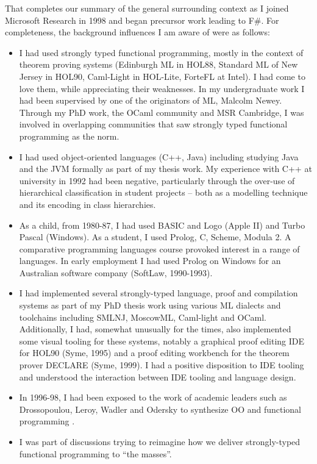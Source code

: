 \documentclass[acmsmall]{acmart}\settopmatter{}
\begin{document}
That completes our summary of the general surrounding context as I joined Microsoft Research in 1998 and began precursor work leading to F\#. For completeness,
the background influences I am aware of were as follows:

\begin{itemize}
\item I had used strongly typed functional programming, mostly in the context of theorem proving systems (Edinburgh ML in HOL88, Standard ML
of New Jersey in HOL90, Caml-Light in HOL-Lite, ForteFL at Intel). I had come to love them, while appreciating their weaknesses. In my undergraduate work
I had been supervised by one of the originators of ML, Malcolm Newey. Through my PhD work, the OCaml community and MSR Cambridge, I was
involved in overlapping communities that saw strongly typed functional programming as the norm.
\item I had used object-oriented languages (C++, Java) including studying Java and the JVM formally as part of my thesis work.  My
experience with C++ at university in 1992 had been negative, particularly through the over-use of hierarchical classification in student
projects – both as a modelling technique and its encoding in class hierarchies.  
\item As a child, from 1980-87, I had used BASIC and Logo (Apple II) and Turbo Pascal (Windows). As a student, I used Prolog, C, Scheme, Modula 2. A
comparative programming languages course provoked interest in a range of languages. In early employment I had used Prolog on Windows for an Australian
software company (SoftLaw, 1990-1993). 
\item I had implemented several strongly-typed language, proof and compilation systems as part of my PhD thesis work using various ML dialects and
toolchains including SMLNJ, MoscowML, Caml-light and OCaml. Additionally, I had, somewhat unusually for the times, also implemented some visual tooling
for these systems, notably a graphical proof editing IDE for HOL90 (Syme, 1995) and a proof editing workbench for the theorem prover DECLARE (Syme, 1999).  I
had a positive disposition to IDE tooling and understood the interaction between IDE tooling and language design.
\item In 1996-98, I had been exposed to the work of academic leaders such as Drossopoulou, Leroy, Wadler and Odersky to synthesize OO and functional
programming \citep{alvesfoss99}.
\item I was part of discussions trying to reimagine how we deliver strongly-typed functional programming to “the masses”.
\end{itemize}
\end{document}
